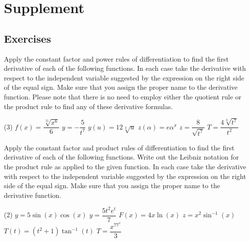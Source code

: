 \documentclass[12pt,]{book}
\theoremstyle{plain}
\theoremstyle{definition}
\numberwithin{equation}{section}
\newcommand{\fe}[2]{#1\mathopen{}\left(#2\right)\mathclose{}}
\begin{document}
\section[Supplement]{Supplement}\label{derivative-formulas-supplementary-exercises}
\typeout{************************************************}
\typeout{************************************************}
\subsection[Exercises]{Exercises}\label{exercises-42}
\hypertarget{exercisegroup-84}{\null}Apply the constant factor and power rules of differentiation to find the first derivative of each of the following functions.  In each case take the derivative with respect to the independent variable suggested by the expression on the right side of the equal sign.  Make sure that you assign the proper name to the derivative function.  Please note that there is no need to employ either the quotient rule or the product rule to find any of these derivative formulas.%
\par
\begin{exercisegroup}(3)
\exercise[1.]\hypertarget{exercise-401}{\null}\(\fe{f}{x}=\dfrac{\sqrt[11]{x^6}}{6}\)%
\exercise[2.]\hypertarget{exercise-402}{\null}\(y=-\dfrac{5}{t^7}\)%
\exercise[3.]\hypertarget{exercise-403}{\null}\(\fe{y}{u}=12\sqrt[3]{u}\)%
\exercise[4.]\hypertarget{exercise-404}{\null}\(\fe{z}{\alpha}=e\alpha^{\pi}\)%
\exercise[5.]\hypertarget{exercise-405}{\null}\(z=\dfrac{8}{\sqrt{t^7}}\)%
\exercise[6.]\hypertarget{exercise-406}{\null}\(T=\dfrac{4\sqrt[3]{t^7}}{t^2}\)%
\end{exercisegroup}
\par\smallskip\noindent
\hypertarget{exercisegroup-85}{\null}Apply the constant factor and product rules of differentiation to find the first derivative of each of the following functions.   Write out the Leibniz notation for the product rule as applied to the given function. In each case take the derivative with respect to the independent variable suggested by the expression on the right side of the equal sign.  Make sure that you assign the proper name to the derivative function.%
\par
\begin{exercisegroup}(2)
\exercise[7.]\hypertarget{exercise-407}{\null}\(y=5\fe{\sin}{x}\fe{\cos}{x}\)%
\exercise[8.]\hypertarget{exercise-408}{\null}\(y=\dfrac{5t^2e^t}{7}\)%
\exercise[9.]\hypertarget{exercise-409}{\null}\(\fe{F}{x}=4x\fe{\ln}{x}\)%
\exercise[10.]\hypertarget{exercise-410}{\null}\(z=x^2\fe{\sin^{-1}}{x}\)%
\exercise[11.]\hypertarget{exercise-411}{\null}\(\fe{T}{t}=(t^2+1)\fe{\tan^{-1}}{t}\)%
\exercise[12.]\hypertarget{exercise-412}{\null}\(T=\dfrac{x^77^x}{3}\)%
\end{exercisegroup}
\end{document}
